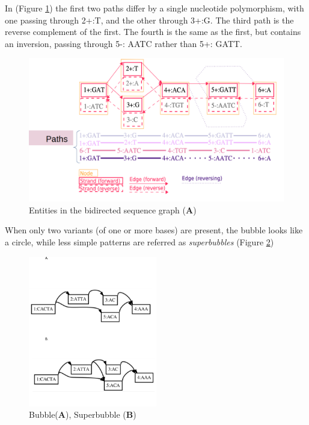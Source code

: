 In (Figure \ref{fig:gfa.png}) the first two paths differ by a single nucleotide polymorphism, with one passing through 2+:T, and the other through 3+:G. The third path is the reverse complement of the first. The fourth is the same as the first, but contains an inversion, passing through 5-: AATC rather than 5+: GATT.



\begin{figure}[H]
\centering
\includegraphics[width=1.00\textwidth]{fig/GFA.png}
\decoRule
\caption{Entities in the bidirected sequence graph (\textbf{A}) \cite{eizenga2020succinct}}
\label{fig:gfa.png}
\end{figure}

When only two variants (of one or more bases) are present, the bubble looks like a circle, while less simple patterns are referred as \textit{superbubbles} (Figure \ref{fig:sup_bub.png})

\begin{figure}[H]
\centering
\includegraphics[width=0.50\textwidth]{fig/bub_sup.png}
\decoRule
\caption{Bubble(\textbf{A}), Superbubble (\textbf{B})  }
\label{fig:sup_bub.png}
\end{figure}

